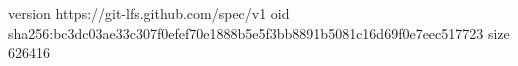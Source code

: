 version https://git-lfs.github.com/spec/v1
oid sha256:bc3dc03ae33c307f0efef70e1888b5e5f3bb8891b5081c16d69f0e7eec517723
size 626416
